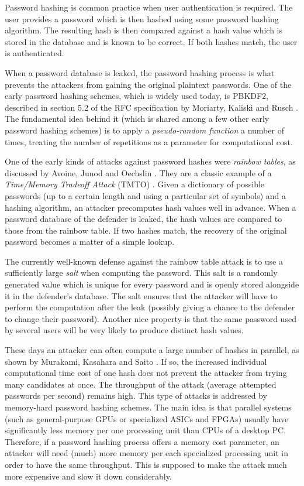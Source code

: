 Password hashing is common practice when user authentication is required. The user provides a password which is then hashed using some password hashing algorithm. The resulting hash is then compared against a hash value which is stored in the database and is known to be correct. If both hashes match, the user is authenticated.

When a password database is leaked, the password hashing process is what prevents the attackers from gaining the original plaintext passwords. One of the early password hashing schemes, which is widely used today, is PBKDF2, described in section 5.2 of the RFC specification by Moriarty, Kaliski and Rusch \cite{moriarty:2017:pkcs}. The fundamental idea behind it (which is shared among a few other early password hashing schemes) is to apply a \emph{pseudo-random function} a number of times, treating the number of repetitions as a parameter for computational cost.

One of the early kinds of attacks against password hashes were \emph{rainbow tables}, as discussed by Avoine, Junod and Oechslin \cite{Avoine:2008:CIT:1380564.1380565}. They are a classic example of a \emph{Time/Memory Tradeoff Attack} (TMTO) \cite{Avoine:2008:CIT:1380564.1380565}. Given a dictionary of possible passwords (up to a certain length and using a particular set of symbols) and a hashing algorithm, an attacker precomputes hash values well in advance. When a password database of the defender is leaked, the hash values are compared to those from the rainbow table. If two hashes match, the recovery of the original password becomes a matter of a simple lookup.

The currently well-known defense against the rainbow table attack is to use a sufficiently large \emph{salt} when computing the password. This salt is a randomly generated value which is unique for every password and is openly stored alongside it in the defender's database. The salt ensures that the attacker will have to perform the computation after the leak (possibly giving a chance to the defender to change their password). Another nice property is that the same password used by several users will be very likely to produce distinct hash values.

These days an attacker can often compute a large number of hashes in parallel, as shown by Murakami, Kasahara and Saito \cite{5665047}. If so, the increased individual computational time cost of one hash does not prevent the attacker from trying many candidates at once. The throughput of the attack (average attempted passwords per second) remains high. This type of attacks is addressed by memory-hard password hashing schemes. The main idea is that parallel systems (such as general-purpose \mbox{GPUs} or specialized \mbox{ASICs} and \mbox{FPGAs}) usually have significantly less memory per one processing unit than \mbox{CPUs} of a desktop \mbox{PC}. Therefore, if a password hashing process offers a memory cost parameter, an attacker will need (much) more memory per each specialized processing unit in order to have the same throughput. This is supposed to make the attack much more expensive and slow it down considerably.


